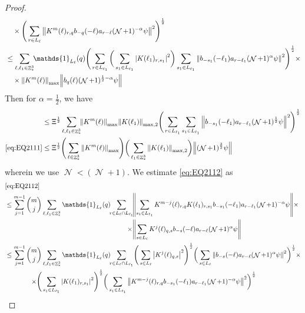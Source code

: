 \documentclass[sn-mathphys, Numbered ,a4paper]{sn-jnl}%
\DeclareMathOperator{\Z}{\mathbb{Z}}
\DeclareMathOperator{\NN}{\mathcal{N}}
\newcommand{\half}{\frac{1}{2}}
\theoremstyle{plain}
\theoremstyle{definition}
\theoremstyle{remark}
\theoremstyle{plain}
\theoremstyle{definition}
\theoremstyle{remark}
\begin{document}
\begin{proof}
\begin{align}
 	&\quad \times \Bigg( \sum\limits_{r \in L_\ell}  \norm{  K^{m}(\ell)_{r,q}  b_{-q}(-\ell) a_{r-\ell} (\NN+1)^{-\alpha}\psi }^2\Bigg)^\half \nonumber\\
 	&\leq \sum\limits_{\ell,\ell_1 \in \Z^3_*} \!\!\mathds{1}_{L_\ell}(q) \Bigg( \sum\limits_{r \in L_{\ell_1}} \bigg( \sum\limits_{s_1 \in L_{\ell_1}}\abs{K(\ell_1)_{r,s_1}}^2\bigg) \sum\limits_{s_1 \in L_{\ell_1}} \norm{ b_{-s_1}(-\ell_1)  a_{r-\ell_1} (\NN+1)^{\alpha}\psi}^2\Bigg)^\half \times\nonumber\\
 	&\quad \times  \norm{  K^{m}(\ell)}_{\mathrm{max}} \norm{b_{q}(\ell) (\NN+1)^{\half-\alpha}\psi } \nonumber\\
\end{align}
	Then for $\alpha = \half$, we have 
\begin{align}
 	&\leq \Xi^\half \sum\limits_{\ell,\ell_1 \in \Z^3_*} \!\! \norm{ K^{m}(\ell)}_{\mathrm{max}} \norm{K(\ell_1)}_{\mathrm{max,2}}  \Bigg( \sum\limits_{r \in L_{\ell_1}} \sum\limits_{s_1 \in L_{\ell_1}} \norm{ b_{-s_1}(-\ell_1)  a_{r-\ell_1} (\NN+1)^{\half}\psi}^2\Bigg)^\half \nonumber\\
 	\eqref{eq:EQ2111}&\leq \Xi^\half \Bigg(\sum\limits_{\ell \in \Z^3_*}  \norm{  K^{m}(\ell)}_{\mathrm{max}}\Bigg) \bigg(\sum\limits_{\ell_1 \in \Z^3_*} \norm{K(\ell_1)}_{\mathrm{max,2}} \bigg) \norm{ (\NN+1)^{\frac{3}{2}}\psi}  \label{eq:estEQ2111} 
 \end{align}
 wherein we use $\NN<(\NN+1)$. We estimate \eqref{eq:EQ2112} as 
  \begin{alignat}{2}
  	&\eqref{eq:EQ2112}\nonumber\\
  	&\leq \sum\limits_{j=1}^{m-1} {{m}\choose j} \sum\limits_{\ell, \ell_1\in \Z^3_*} \mathds{1}_{L_{\ell}}(q)\!\! \begin{aligned}[t]
  	\sum\limits_{r\in L_{\ell} \cap L_{\ell_1}}\! &\norm{  \sum\limits_{s_1 \in L_{\ell_1}} K^{m-j}(\ell)_{r,q} K(\ell_1)_{r,s_1} b_{-s_1}(-\ell_1) a_{r-\ell_1} (\NN+1)^{-\alpha}\psi}\times\nonumber \\\times &\norm{\sum\limits_{s \in L_\ell} K^{j}(\ell)_{q,s}  b_{-s}(-\ell)  a_{r-\ell} (\NN+1)^{\alpha}\psi }
  	\end{aligned} \nonumber\\
    &\leq \sum\limits_{j=1}^{m-1} \begin{aligned}[t] {{m}\choose j} &\sum\limits_{\ell, \ell_1\in \Z^3_*} \mathds{1}_{L_{\ell}}(q)\!\! 
    \sum\limits_{r\in L_{\ell} \cap L_{\ell_1}}\! \Bigg( \sum\limits_{s \in L_\ell} \abs{K^{j}(\ell)_{q,s}}^2\Bigg)^\half \bigg( \sum\limits_{s \in L_\ell}\norm{  b_{-s}(-\ell) a_{r-\ell} (\NN+1)^{\alpha}\psi}^2\bigg)^\half \times\nonumber\\ \times \Bigg( &\sum\limits_{s_1 \in L_{\ell_1}}\abs{K(\ell_1)_{r,s_1}}^2\Bigg)^\half \bigg(\sum\limits_{s_1 \in L_{\ell_1}}\norm{ K^{m-j}(\ell)_{r,q}  b_{-s_1}(-\ell_1)  a_{r-\ell_1} (\NN+1)^{-\alpha}\psi }^2\bigg)^\half

\end{aligned}
\end{alignat}
\end{proof}
\end{document}
